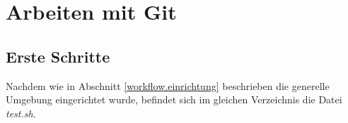 \section{Arbeiten mit Git}

\subsection{Erste Schritte}
Nachdem wie in Abschnitt \ref{workflow.einrichtung} beschrieben die generelle Umgebung eingerichtet wurde, befindet sich im gleichen Verzeichnis die Datei \textit{test.sh}.